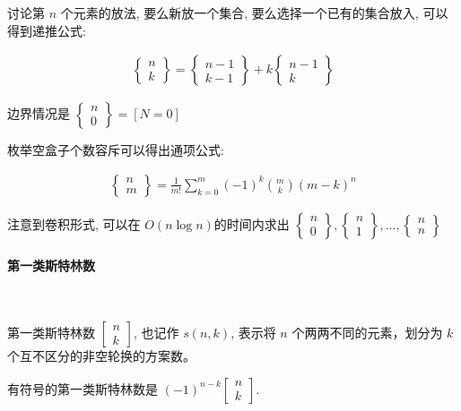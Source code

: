 \documentclass{ctexart}
\begin{document}
讨论第 $n$ 个元素的放法, 要么新放一个集合, 要么选择一个已有的集合放入, 可以得到递推公式:

\begin{align*}
    \begin{Bmatrix} n\\ k \end{Bmatrix} = \begin{Bmatrix} {n-1}\\ {k-1} \end{Bmatrix} + k \begin{Bmatrix} {n-1}\\ k \end{Bmatrix}
\end{align*}

边界情况是 $\begin{Bmatrix} n\\ 0 \end{Bmatrix}=[N=0]$

枚举空盒子个数容斥可以得出通项公式:

\begin{align*}
    \begin{Bmatrix} n\\ m \end{Bmatrix} = \frac{1}{m!}\sum_{k=0}^{m}(-1)^k \binom{m}{k} (m-k)^n
\end{align*}

注意到卷积形式, 可以在 $O(n\log n)$的时间内求出 $\begin{Bmatrix} n\\ 0 \end{Bmatrix}, \begin{Bmatrix} n\\ 1 \end{Bmatrix}, ... ,\begin{Bmatrix} n\\ n \end{Bmatrix}$

\paragraph{第一类斯特林数}\ 

第一类斯特林数 $ \begin{bmatrix} n\\ k \end{bmatrix}$, 也记作 $s(n,k)$, 表示将 $n$ 个两两不同的元素，划分为 $k$ 个互不区分的非空轮换的方案数。

有符号的第一类斯特林数是 $(-1)^{n-k} \begin{bmatrix} n\\ k \end{bmatrix}$.
\end{document}
